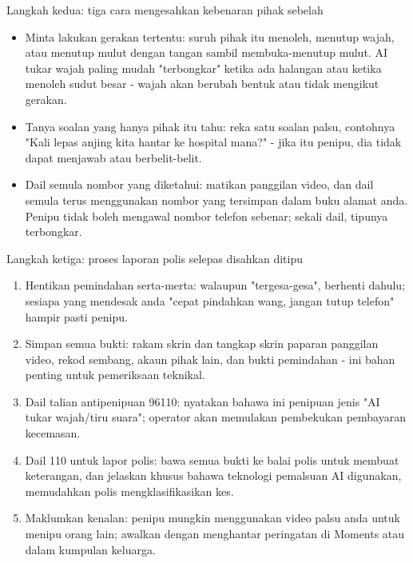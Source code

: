 \begin{tcbinfo}{Langkah kedua: tiga cara mengesahkan kebenaran pihak sebelah}
\begin{itemize}
  \item Minta lakukan gerakan tertentu: suruh pihak itu menoleh, menutup wajah, atau menutup mulut dengan tangan sambil membuka-menutup mulut. AI tukar wajah paling mudah "terbongkar" ketika ada halangan atau ketika menoleh sudut besar - wajah akan berubah bentuk atau tidak mengikut gerakan.
  \item Tanya soalan yang hanya pihak itu tahu: reka satu soalan palsu, contohnya "Kali lepas anjing kita hantar ke hospital mana?" - jika itu penipu, dia tidak dapat menjawab atau berbelit-belit.
  \item Dail semula nombor yang diketahui: matikan panggilan video, dan dail semula terus menggunakan nombor yang tersimpan dalam buku alamat anda. Penipu tidak boleh mengawal nombor telefon sebenar; sekali dail, tipunya terbongkar.
\end{itemize}

\end{tcbinfo}

\begin{tcbwarn}{Langkah ketiga: proses laporan polis selepas disahkan ditipu}
\begin{enumerate}
  \item Hentikan pemindahan serta-merta: walaupun "tergesa-gesa", berhenti dahulu; sesiapa yang mendesak anda "cepat pindahkan wang, jangan tutup telefon" hampir pasti penipu.
  \item Simpan semua bukti: rakam skrin dan tangkap skrin paparan panggilan video, rekod sembang, akaun pihak lain, dan bukti pemindahan - ini bahan penting untuk pemeriksaan teknikal.
  \item Dail talian antipenipuan 96110: nyatakan bahawa ini penipuan jenis "AI tukar wajah/tiru suara"; operator akan memulakan pembekukan pembayaran kecemasan.
  \item Dail 110 untuk lapor polis: bawa semua bukti ke balai polis untuk membuat keterangan, dan jelaskan khusus bahawa teknologi pemalsuan AI digunakan, memudahkan polis mengklasifikasikan kes.
  \item Maklumkan kenalan: penipu mungkin menggunakan video palsu anda untuk menipu orang lain; awalkan dengan menghantar peringatan di Moments atau dalam kumpulan keluarga.
\end{enumerate}

\end{tcbwarn}

